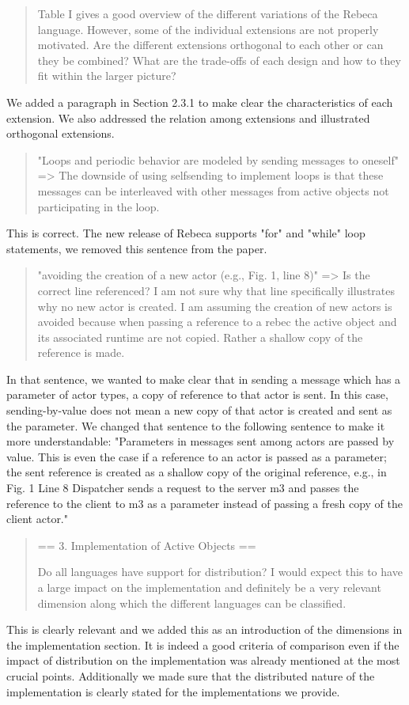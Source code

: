\documentclass{article}
\begin{document}
\begin{quote}
	Table I gives a good overview of the different variations of the Rebeca language. 
However, some of the individual extensions are not properly motivated. Are the different 
extensions orthogonal to each other or can they be combined? What are the trade-offs of 
each design and how to they fit within the larger picture?
\end{quote}

We added a paragraph in Section 2.3.1 to make clear the characteristics of each 
extension. We also addressed the relation among extensions and illustrated orthogonal 
extensions.


\begin{quote}
"Loops and periodic behavior are modeled by sending messages to oneself" => The downside 
of using selfsending to implement loops is that these messages can be interleaved with 
other messages from active objects not participating in the loop.
\end{quote}
This is correct.  The new release of Rebeca supports "for" and "while" loop statements, 
we removed this sentence from the paper.


\begin{quote}
	"avoiding the creation of a new actor (e.g., Fig. 1, line 8)" => Is the correct line 
referenced? I am not sure why that line specifically illustrates why no new actor is 
created. I am assuming the creation of new actors is avoided because when passing a 
reference to a rebec the active object and its associated runtime are not copied. Rather 
a shallow copy of the reference is made.
\end{quote}

In that sentence, we wanted to make clear that in sending a message which has a parameter 
of actor types, a copy of reference to that actor is sent. In this case, sending-by-value 
does not mean a new copy of that actor is created and sent as the parameter.
We changed that sentence to the following sentence to make it more understandable: 
"Parameters in messages sent among actors are passed by value. This is even the case if a 
reference to an actor is passed as a parameter; the sent reference is created as a 
shallow copy of the original reference, e.g., in Fig. 1 Line 8 Dispatcher sends a request 
to the server m3 and passes the reference to the client to m3 as a parameter instead of 
passing a fresh copy of the client actor."


\begin{quote}
	== 3. Implementation of Active Objects ==

Do all languages have support for distribution? I would expect this to have a large 
impact on the implementation and definitely be a very relevant dimension along which the 
different languages can be classified.
\end{quote}
This is clearly relevant and  we added this as an introduction of the dimensions in the 
implementation section. It 
is indeed a good criteria of comparison even if the impact of 
distribution on the implementation was already 
mentioned at the most crucial points. Additionally we made sure that the distributed 
nature of the 
implementation is clearly stated for the implementations we provide.
\end{document}
